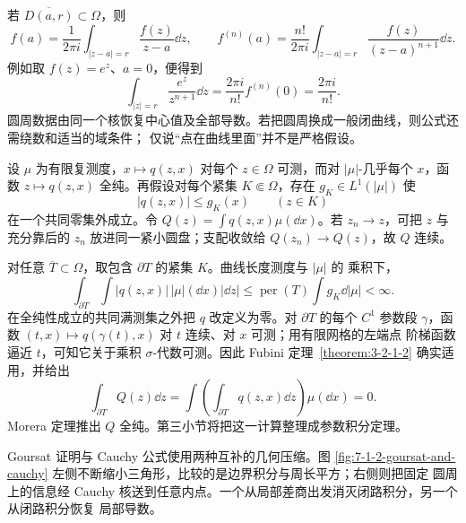 \begin{example}[Cauchy 核]\label{ex:7-1-2-2}
若 $\overline{D(a,r)}\subset\Omega$，则
\[
 f(a)=\frac1{2\pi i}\int_{|z-a|=r}\frac{f(z)}{z-a}\dd z,
 \qquad
 f^{(n)}(a)=\frac{n!}{2\pi i}\int_{|z-a|=r}
                  \frac{f(z)}{(z-a)^{n+1}}\dd z.
\]
例如取 $f(z)=e^z$、$a=0$，便得到
\[
 \int_{|z|=r}\frac{e^z}{z^{n+1}}\dd z
 =\frac{2\pi i}{n!}f^{(n)}(0)=\frac{2\pi i}{n!}.
\]
圆周数据由同一个核恢复中心值及全部导数。若把圆周换成一般闭曲线，则公式还需绕数和适当的域条件；
仅说“点在曲线里面”并不是严格假设。
\end{example}

\begin{example}\label{ex:7-1-2-3}
设 $\mu$ 为有限复测度，$x\mapsto q(z,x)$ 对每个 $z\in\Omega$ 可测，而对 $|\mu|$-几乎每个
$x$，函数 $z\mapsto q(z,x)$ 全纯。再假设对每个紧集 $K\Subset\Omega$，存在
$g_K\in L^1(|\mu|)$ 使
\[
 |q(z,x)|\le g_K(x)\qquad(z\in K)
\]
在一个共同零集外成立。令 $Q(z)=\int q(z,x)\mu(\dd x)$。若 $z_n\to z$，可把 $z$ 与充分靠后的
$z_n$ 放进同一紧小圆盘；支配收敛给 $Q(z_n)\to Q(z)$，故 $Q$ 连续。

对任意 $\overline T\subset\Omega$，取包含 $\partial T$ 的紧集 $K$。曲线长度测度与 $|\mu|$ 的
乘积下，
\[
 \int_{\partial T}\int |q(z,x)|\,|\mu|(\dd x)|\dd z|
 \le \operatorname{per}(T)\int g_K\dd|\mu|<\infty.
\]
在全纯性成立的共同满测集之外把 $q$ 改定义为零。对 $\partial T$ 的每个 $C^1$ 参数段
$\gamma$，函数 $(t,x)\mapsto q(\gamma(t),x)$ 对 $t$ 连续、对 $x$ 可测；用有限网格的左端点
阶梯函数逼近 $t$，可知它关于乘积 $\sigma$-代数可测。因此 Fubini
定理~\ref{theorem:3-2-1-2} 确实适用，并给出
\[
 \int_{\partial T}Q(z)\dd z
 =\int\left(\int_{\partial T}q(z,x)\dd z\right)\mu(\dd x)=0.
\]
Morera 定理推出 $Q$ 全纯。第三小节将把这一计算整理成参数积分定理。
\end{example}

Goursat 证明与 Cauchy 公式使用两种互补的几何压缩。图
\ref{fig:7-1-2-goursat-and-cauchy} 左侧不断缩小三角形，比较的是边界积分与周长平方；右侧则把固定
圆周上的信息经 Cauchy 核送到任意内点。一个从局部差商出发消灭闭路积分，另一个从闭路积分恢复
局部导数。

